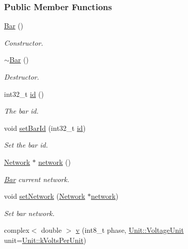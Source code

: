 \subsubsection*{Public Member Functions}
\begin{DoxyCompactItemize}
\item 
\hyperlink{group___models_ga9cae2188fcc6cce41caa7898c64548d1}{Bar} ()
\begin{DoxyCompactList}\small\item\em Constructor. \end{DoxyCompactList}\item 
\hyperlink{group___models_ga9c7ebea0c189423591741ac438985316}{$\sim$\+Bar} ()
\begin{DoxyCompactList}\small\item\em Destructor. \end{DoxyCompactList}\item 
int32\+\_\+t \hyperlink{group___models_gacf0fb781a73856bb7beb823304465e13}{id} ()
\begin{DoxyCompactList}\small\item\em The bar id. \end{DoxyCompactList}\item 
void \hyperlink{group___models_gae3cf341a76cc4589fe3203d0a3ed2ac0}{set\+Bar\+Id} (int32\+\_\+t \hyperlink{group___models_gacf0fb781a73856bb7beb823304465e13}{id})
\begin{DoxyCompactList}\small\item\em Set the bar id. \end{DoxyCompactList}\item 
\hyperlink{class_network}{Network} $\ast$ \hyperlink{group___models_gab0594d5d7313e8749bb85434b255db9a}{network} ()
\begin{DoxyCompactList}\small\item\em \hyperlink{class_bar}{Bar} current network. \end{DoxyCompactList}\item 
void \hyperlink{group___models_gade9a307fdb6a81871787899ec1af5833}{set\+Network} (\hyperlink{class_network}{Network} $\ast$\hyperlink{group___models_gab0594d5d7313e8749bb85434b255db9a}{network})
\begin{DoxyCompactList}\small\item\em Set bar network. \end{DoxyCompactList}\item 
complex$<$ double $>$ \hyperlink{group___models_gab3ed62a7f2eb9c41a0b84543f1ef8d3b}{v} (int8\+\_\+t phase, \hyperlink{class_unit_a55b07dfa9457e1eca2c7194fe0cfc3c1}{Unit\+::\+Voltage\+Unit} unit=\hyperlink{class_unit_a55b07dfa9457e1eca2c7194fe0cfc3c1ab44b1310b59fdcdc9df5bbea91da4206}{Unit\+::k\+Volts\+Per\+Unit})

\end{DoxyCompactItemize}

